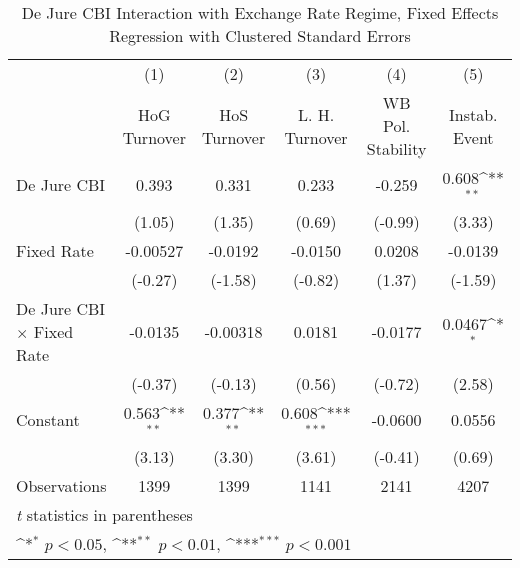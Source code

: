 \begin{table}[htbp]\centering
\def\sym#1{\ifmmode^{#1}\else\(^{#1}\)\fi}
\caption{De Jure CBI Interaction with Exchange Rate Regime, Fixed Effects Regression with Clustered Standard Errors \label{imultIndFEDJ}}
\begin{tabular}{l*{5}{c}}
\toprule
                                        &\multicolumn{1}{c}{(1)}&\multicolumn{1}{c}{(2)}&\multicolumn{1}{c}{(3)}&\multicolumn{1}{c}{(4)}&\multicolumn{1}{c}{(5)}\\
                                        &\multicolumn{1}{c}{HoG Turnover}&\multicolumn{1}{c}{HoS Turnover}&\multicolumn{1}{c}{L. H. Turnover}&\multicolumn{1}{c}{WB Pol. Stability}&\multicolumn{1}{c}{Instab. Event}\\
\midrule
De Jure CBI                             &    0.393         &    0.331         &    0.233         &   -0.259         &    0.608\sym{**} \\
                                        &   (1.05)         &   (1.35)         &   (0.69)         &  (-0.99)         &   (3.33)         \\
\addlinespace
Fixed Rate                              & -0.00527         &  -0.0192         &  -0.0150         &   0.0208         &  -0.0139         \\
                                        &  (-0.27)         &  (-1.58)         &  (-0.82)         &   (1.37)         &  (-1.59)         \\
\addlinespace
De Jure CBI $\times$ Fixed Rate         &  -0.0135         & -0.00318         &   0.0181         &  -0.0177         &   0.0467\sym{*}  \\
                                        &  (-0.37)         &  (-0.13)         &   (0.56)         &  (-0.72)         &   (2.58)         \\
\addlinespace
Constant                                &    0.563\sym{**} &    0.377\sym{**} &    0.608\sym{***}&  -0.0600         &   0.0556         \\
                                        &   (3.13)         &   (3.30)         &   (3.61)         &  (-0.41)         &   (0.69)         \\
\midrule
Observations                            &     1399         &     1399         &     1141         &     2141         &     4207         \\
\bottomrule
\multicolumn{6}{l}{\footnotesize \textit{t} statistics in parentheses}\\
\multicolumn{6}{l}{\footnotesize \sym{*} \(p<0.05\), \sym{**} \(p<0.01\), \sym{***} \(p<0.001\)}\\
\end{tabular}
\end{table}
